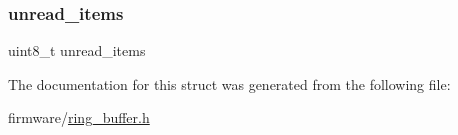 \hypertarget{structring__buffer__t_a0ed89f14dd3a8e0a46a901d73c869804}{}\label{structring__buffer__t_a0ed89f14dd3a8e0a46a901d73c869804} 
\subsubsection{\texorpdfstring{unread\+\_\+items}{unread\_items}}
{\footnotesize\ttfamily uint8\+\_\+t unread\+\_\+items}



The documentation for this struct was generated from the following file\+:\begin{DoxyCompactItemize}
\item 
firmware/\hyperlink{ring__buffer_8h}{ring\+\_\+buffer.\+h}\end{DoxyCompactItemize}
